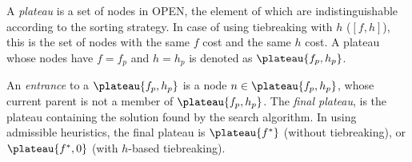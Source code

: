 A \emph{plateau} is a set of nodes in OPEN, the element of which are
indistinguishable according to the sorting strategy. In case of \astar
using tiebreaking with $h$ ($[f,h]$), this is the set of nodes with the
same $f$ cost and the same $h$ cost.
A plateau whose nodes have $f=f_p$ and $h=h_p$ is denoted as $\plateau{f_p,h_p}$.

An \emph{entrance} to a $\plateau{f_p,h_p}$ is a node $n \in
\plateau{f_p,h_p}$, whose current parent is not a member of
$\plateau{f_p,h_p}$.  The \emph{final plateau}, is the plateau
containing the solution found by the search algorithm.  In \astar using
admissible heuristics, the final plateau is $\plateau{f^*}$ (without
tiebreaking), or $\plateau{f^*,0}$ (with $h$-based tiebreaking).
